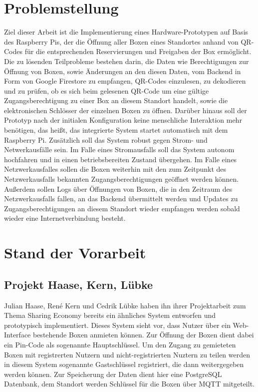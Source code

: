 \documentclass[openright,twoside,a4paper]{scrartcl}
\begin{document}
    \section{Problemstellung}
        Ziel dieser Arbeit ist die Implementierung eines Hardware-Prototypen auf Basis des Raspberry Pis, der die Öffnung aller Boxen eines Standortes anhand von QR-Codes für die entsprechenden Reservierungen und Freigaben der Box ermöglicht.
        Die zu lösenden Teilprobleme bestehen darin, die Daten wie Berechtigungen zur Öffnung von Boxen, sowie Änderungen an den diesen Daten, vom Backend in Form von Google Firestore zu empfangen, QR-Codes einzulesen, zu dekodieren und zu prüfen, ob es sich beim gelesenen QR-Code um eine gültige Zugangsberechtigung zu einer Box an diesem Standort handelt, sowie die elektronischen Schlösser der einzelnen Boxen zu öffnen.
        Darüber hinaus soll der Prototyp nach der initialen Konfiguration keine menschliche Interaktion mehr benötigen, das heißt, das integrierte System startet automatisch mit dem Raspberry Pi.
        Zusätzlich soll das System robust gegen Strom- und Netwerkausfälle sein.
        Im Falle eines Stromausfalls soll das System autonom hochfahren und in einen betriebsbereiten Zustand übergehen.
        Im Falle eines Netzwerkausfalles sollen die Boxen weiterhin mit den zum Zeitpunkt des Netzwerkausfalls bekannten Zugangsberechtigungen geöffnet werden können. Außerdem sollen Logs über Öffnungen von Boxen, die in den Zeitraum des Netzwerkausfalls fallen, an das Backend übermittelt werden und Updates zu Zugangsberechtigungen an diesem Standort wieder empfangen werden sobald wieder eine Internetverbindung besteht.



    \section{Stand der Vorarbeit}
        \subsection{Projekt Haase, Kern, Lübke}
            Julian Haase, René Kern und Cedrik Lübke haben ihn ihrer Projektarbeit zum Thema Sharing Economy bereits ein ähnliches System entworfen und prototypisch implementiert.
            Dieses System sieht vor, dass Nutzer über ein Web-Interface bestehende Boxen anmieten können. Zur Öffnung der Boxen dient dabei ein Pin-Code als sogenannte Hauptschlüssel. Um den Zugang zu gemieteten Boxen mit registrerten Nutzern und nicht-registrierten Nuztern zu teilen werden in diesem System sogenannte Gastschlüssel registriert, die dann weitergegeben werden können. Zur Speicherung der Daten dient hier eine PostgreSQL Datenbank, dem Standort werden Schlüssel für die Boxen über MQTT mitgeteilt.\cite{Boxen}
\end{document}
